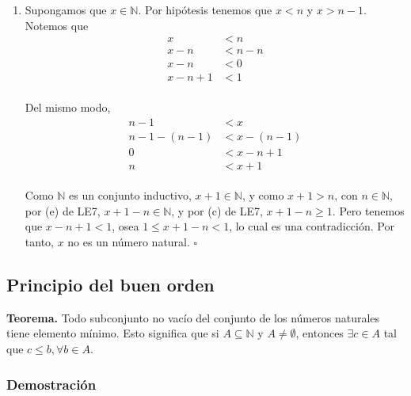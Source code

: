 \documentclass[11pt]{article}
\newcommand{\N}{\mathbb{N}}
\begin{document}
\begin{enumerate}[label=\alph*)]
    \item Supongamos que $x\in \N$. Por hipótesis tenemos que $x<n$ y $x>n-1$. Notemos que \begin{align*}
        x &< n\\
        x -n &< n-n\\
        x-n &< 0\\
        x-n +1 &< 1
    \end{align*}\\
    Del mismo modo, \begin{align*}
        n-1 &< x\\
        n-1-(n-1) &< x - (n-1)\\
        0 &< x-n+1\\
        n &< x+1
    \end{align*}\\
    Como $\N$ es un conjunto inductivo, $x+1\in \N$, y como $x+1>n$, con $n\in \N$, por (e) de LE7, $x+1-n \in \N$, y por (c) de LE7, $x+1-n\geq 1$. Pero tenemos que $x-n+1<1$, osea $1\leq x+1-n<1$, lo cual es una contradicción. Por tanto, $x$ no es un número natural. \mbox{}\hfill $\square$
\end{enumerate}

\subsection*{Principio del buen orden}

\textbf{Teorema.} Todo subconjunto no vacío del conjunto de los números naturales tiene elemento mínimo. Esto significa que si $A\subseteq \N$ y $A \neq \emptyset$, entonces $\exists c\in A$ tal que $c\leq b, \forall b\in A$.

\subsubsection*{Demostración}
\end{document}

